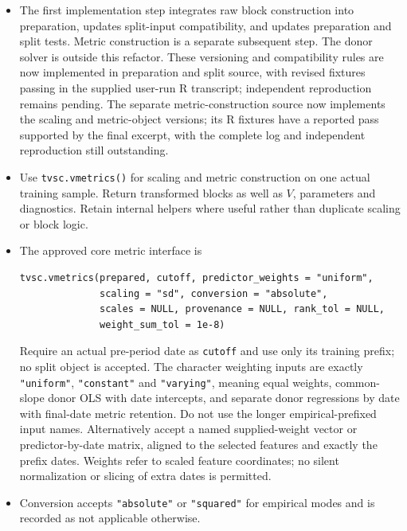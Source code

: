 \documentclass[11pt]{article}
\begin{document}
\begin{itemize}
split-input compatibility to accept it. Do not silently upgrade old
objects. Reject incompatible preparation objects with instructions to
rerun preparation from the original panel; changing a version field
manually is not migration. Check required fields, dimensions, ordering
and relevant metadata as well as class and version.
\item The first implementation step integrates raw block construction
into preparation, updates split-input compatibility, and updates
preparation and split tests. Metric construction is a separate subsequent
step. The donor solver is outside this refactor. These versioning and
compatibility rules are now implemented in preparation and split source,
with revised fixtures passing in the supplied user-run R transcript;
independent reproduction remains pending. The separate metric-construction
source now implements the scaling and metric-object versions; its R
fixtures have a reported pass supported by the final excerpt, with the
complete log and independent reproduction still outstanding.
\item Use \texttt{tvsc.vmetrics()} for scaling and metric construction
on one actual training sample. Return transformed blocks as well as $V$,
parameters and diagnostics. Retain internal helpers where useful rather
than duplicate scaling or block logic.
\item The approved core metric interface is
\begin{verbatim}
tvsc.vmetrics(prepared, cutoff, predictor_weights = "uniform",
              scaling = "sd", conversion = "absolute",
              scales = NULL, provenance = NULL, rank_tol = NULL,
              weight_sum_tol = 1e-8)
\end{verbatim}
Require an actual pre-period date as \texttt{cutoff} and use only its
training prefix; no split object is accepted. The character weighting
inputs are exactly \texttt{"uniform"}, \texttt{"constant"} and
\texttt{"varying"}, meaning equal weights, common-slope donor OLS with
date intercepts, and separate donor regressions by date with final-date
metric retention. Do not use the longer empirical-prefixed input names.
Alternatively accept a named supplied-weight vector or predictor-by-date
matrix, aligned to the selected features and exactly the prefix dates.
Weights refer to scaled feature coordinates; no silent normalization or
slicing of extra dates is permitted.
\item Conversion accepts \texttt{"absolute"} or \texttt{"squared"}
for empirical modes and is recorded as not applicable otherwise.

\end{itemize}
\end{document}
